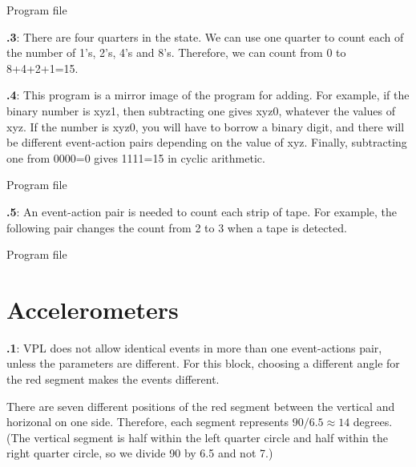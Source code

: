\documentclass[11pt,a4paper,english]{article}
\begin{document}
{\raggedleft \hfill Program file }


\textbf{\thesection.3}:
There are four quarters in the state. We can use one quarter to count
each of the number of 1's, 2's, 4's and 8's. Therefore, we can count
from 0 to 8+4+2+1=15.


\textbf{\thesection.4}:
This program is a mirror image of the program for adding.
For example, if the binary number is xyz1,
then subtracting one gives xyz0, whatever the values of xyz.
If the number is xyz0, you will have to borrow a binary digit,
and there will be different event-action pairs depending on the value
of xyz. Finally, subtracting one from 0000=0 gives 1111=15 in cyclic
arithmetic.

{\raggedleft \hfill Program file }

\textbf{\thesection.5}:
An event-action pair is needed to count each strip of tape.
For example, the following pair  changes the count from 2 to 3 when a tape is detected.

{\raggedleft \hfill Program file }


\section{Accelerometers}

\textbf{\thesection.1}: VPL does not allow identical events in more than
one event-actions pair, unless the parameters are different. For this
block, choosing a different angle for the red segment makes the events
different.

There are seven different positions of the red segment between the
vertical and horizonal on one side. Therefore, each segment represents
$90 / 6.5 \approx 14$ degrees. (The vertical segment is half within the
left quarter circle and half within the right quarter circle, so we
divide 90 by 6.5 and not 7.)
\end{document}
